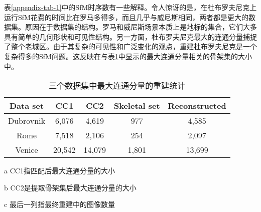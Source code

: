 \begin{translation}
表\ref{appendix-tab-1}中的SfM时序数有一些解释。令人惊讶的是，在杜布罗夫尼克上运行SfM花费的时间比在罗马多得多，而且几乎与威尼斯相同，两者都是更大的数据集。原因在于数据集的结构。罗马和威尼斯场景本质上是地标的集合，它们大多具有简单的几何形状和可见性结构。另一方面，杜布罗夫尼克最大的连通分量捕捉了整个老城区。由于其复杂的可见性和广泛变化的观点，重建杜布罗夫尼克是一个复杂得多的SfM问题。这反映在与表\ref{appendix-tab-2}中显示的最大连通分量相关的骨架集的大小中。
\begin{table}
	\centering
	\begin{threeparttable}[c]
		\caption{三个数据集中最大连通分量的重建统计}
		\label{appendix-tab-2}
		\begin{tabular}{ccccc}
			\hline
			\textbf{Data set}     & \textbf{CC1\tnote{a}}     & \textbf{CC2\tnote{b}}     & \textbf{Skeletal set}    & \textbf{Reconstructed\tnote{c}}    \\ \hline
			Dubrovnik             & 6,076            & 4,619            & 977                      & 4,585                     \\
			Rome                  & 7,518            & 2,106            & 254                      & 2,097                     \\
			Venice                & 20,542           & 14,079           & 1,801                    & 13,699                    \\ \hline
		\end{tabular}
		\begin{tablenotes}
			\item [a] CC1指匹配后最大连通分量的大小 
			\item [b] CC2是提取骨架集后最大连通分量的大小
			\item [c] 最后一列指最终重建中的图像数量 
		\end{tablenotes}
	\end{threeparttable}
\end{table}


\end{translation}
